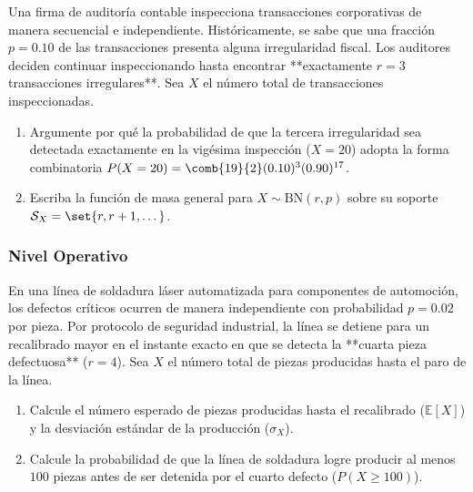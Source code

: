 \begin{problema}
	\label{prob:3.5.3}
	Una firma de auditoría contable inspecciona transacciones corporativas de manera secuencial e independiente. Históricamente, se sabe que una fracción $p = 0.10$ de las transacciones presenta alguna irregularidad fiscal. Los auditores deciden continuar inspeccionando hasta encontrar **exactamente $r = 3$ transacciones irregulares**. Sea $X$ el número total de transacciones inspeccionadas.
	\begin{enumerate}
		\item Argumente por qué la probabilidad de que la tercera irregularidad sea detectada exactamente en la vigésima inspección ($X = 20$) adopta la forma combinatoria $P(X = 20) = \comb{19}{2} (0.10)^3 (0.90)^{17}$.
		\item Escriba la función de masa general para $X \sim \text{BN}(r, p)$ sobre su soporte $\mathcal{S}_X = \set{r, r+1, \dots}$.
	\end{enumerate}
\end{problema}

\subsubsection*{Nivel Operativo}

\begin{problema}
	\label{prob:3.5.4}
	En una línea de soldadura láser automatizada para componentes de automoción, los defectos críticos ocurren de manera independiente con probabilidad $p = 0.02$ por pieza. Por protocolo de seguridad industrial, la línea se detiene para un recalibrado mayor en el instante exacto en que se detecta la **cuarta pieza defectuosa** ($r = 4$). Sea $X$ el número total de piezas producidas hasta el paro de la línea.
	\begin{enumerate}
		\item Calcule el número esperado de piezas producidas hasta el recalibrado ($\mathbb{E}[X]$) y la desviación estándar de la producción ($\sigma_X$).
		\item Calcule la probabilidad de que la línea de soldadura logre producir al menos $100$ piezas antes de ser detenida por el cuarto defecto ($P(X \ge 100)$).
	\end{enumerate}
\end{problema}

